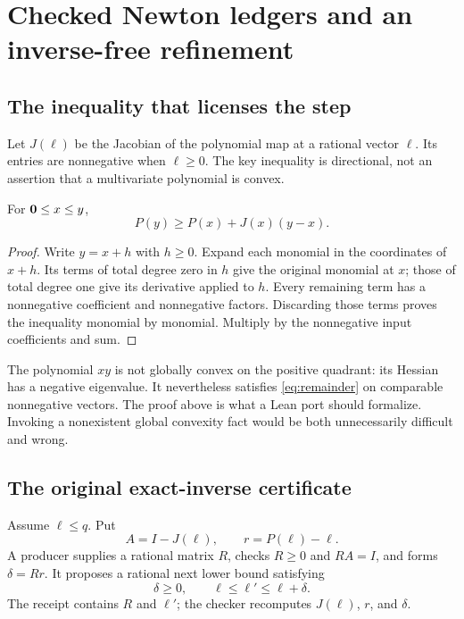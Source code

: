 \section{Checked Newton ledgers and an inverse-free refinement}
\label{sec:newton}
\subsection{The inequality that licenses the step}
Let $J(\ell)$ be the Jacobian of the polynomial map at a rational vector $\ell$. Its entries are nonnegative when $\ell\ge0$. The key inequality is directional, not an assertion that a multivariate polynomial is convex.

\begin{lemma}
\label{lem:remainder}
For $\mathbf 0\le x\le y$,
\begin{equation}
 \label{eq:remainder}
 P(y)\ge P(x)+J(x)(y-x).
\end{equation}
\end{lemma}
\begin{proof}
Write $y=x+h$ with $h\ge0$. Expand each monomial in the coordinates of $x+h$. Its terms of total degree zero in $h$ give the original monomial at $x$; those of total degree one give its derivative applied to $h$. Every remaining term has a nonnegative coefficient and nonnegative factors. Discarding those terms proves the inequality monomial by monomial. Multiply by the nonnegative input coefficients and sum.
\end{proof}

The polynomial $xy$ is not globally convex on the positive quadrant: its Hessian has a negative eigenvalue. It nevertheless satisfies \eqref{eq:remainder} on comparable nonnegative vectors. The proof above is what a Lean port should formalize. Invoking a nonexistent global convexity fact would be both unnecessarily difficult and wrong.

\subsection{The original exact-inverse certificate}
Assume $\ell\le q$. Put
\[
 A=I-J(\ell),\qquad r=P(\ell)-\ell.
\]
A producer supplies a rational matrix $R$, checks $R\ge0$ and $RA=I$, and forms $\delta=Rr$. It proposes a rational next lower bound satisfying
\begin{equation}
 \label{eq:newton-conditions}
 \delta\ge0,\qquad \ell\le\ell'\le\ell+\delta.
\end{equation}
The receipt contains $R$ and $\ell'$; the checker recomputes $J(\ell)$, $r$, and $\delta$.

